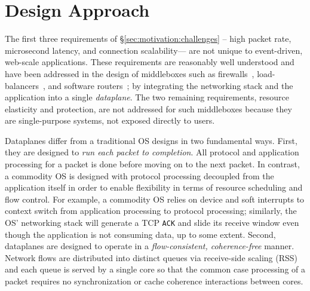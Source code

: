 \section{\ix Design Approach}
\label{sec:design}


The first three requirements of \S\ref{sec:motivation:challenges} --
high packet rate, microsecond latency, and connection scalability---
are not unique to event-driven, web-scale applications.  These
requirements are reasonably well understood and have been addressed in
the design of middleboxes such as firewalls~\cite{missing},
load-balancers~\cite{missing}, and software
routers~\cite{DBLP:journals/tocs/KohlerMCJK00,DBLP:conf/sosp/DobrescuEACFIKMR09};
by integrating the networking stack and the application into a single
\emph{dataplane}. The two remaining requirements, resource elasticity
and protection, are not addressed for such middleboxes because they
are single-purpose systems, not exposed directly to users. 


Dataplanes differ from a traditional OS designs in two fundamental
ways. First, they are designed to \emph{run each packet to
  completion}. All protocol and application processing for a packet is
done before moving on to the next packet.  In contrast, a commodity OS is designed
with protocol processing decoupled from the application itself in
order to enable flexibility in terms of resource scheduling and flow
control. For example, a commodity OS relies on device and soft interrupts to context switch from application processing to protocol processing; 
similarly, the OS' networking stack will generate a TCP \texttt{ACK} and
slide its receive window even though the application is not consuming
data, up to some extent. Second, dataplanes are designed to operate in
a \emph{flow-consistent, coherence-free} manner.
Network flows are distributed into distinct queues via receive-side
scaling (RSS)~\cite{DBLP:journals/computer/RegnierMIIMHNCF04} and each queue
is served by a single core so that the common case processing of a
packet requires no synchronization or cache coherence interactions
between cores.

